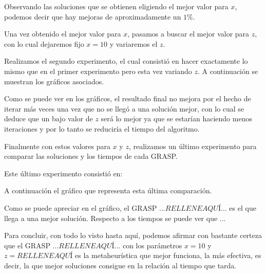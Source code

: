 Observando las soluciones que se obtienen eligiendo el mejor valor para $x$, podemos decir que hay mejoras de aproximadamente un $1\%$.

Una vez obtenido el mejor valor para $x$, pasamos a buscar el mejor valor para $z$, con lo cual dejaremos fijo $x=10$ y variaremos el $z$.

Realizamos el segundo experimento, el cual consistió en hacer exactamente lo mismo que en el primer experimento pero esta vez variando $z$. A continuación se muestran los gráficos asociados.


Como se puede ver en los gráficos, el resultado final no mejora por el hecho de iterar más veces una vez que no se llegó a una solución mejor, con lo cual se deduce que un bajo valor de $z$ será lo mejor ya que se estarían haciendo menos iteraciones y por lo tanto se reduciría el tiempo del algoritmo.

Finalmente con estos valores para $x$ y $z$, realizamos un último experimento para comparar las soluciones y los tiempos de cada GRASP.

Este último experimento consistió en:

A continuación el gráfico que representa esta última comparación.

Como se puede apreciar en el gráfico, el GRASP $...RELLENE AQUÍ...$ es el que llega a una mejor solución. Respecto a los tiempos se puede ver que ... %

Para concluir, con todo lo visto hasta aquí, podemos afirmar con bastante certeza que el GRASP $...RELLENE AQUÍ...$ con los parámetros $x=10$ y $z=RELLENE AQUÍ$ es la metaheurística que mejor funciona, la más efectiva, es decir, la que mejor soluciones consigue en la relación al tiempo que tarda.